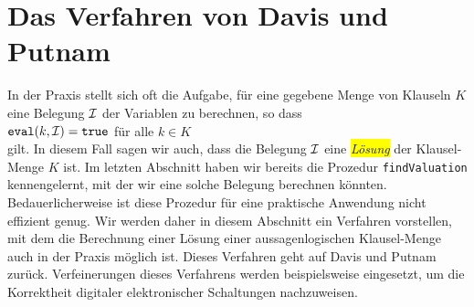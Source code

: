 \section{Das Verfahren von Davis und Putnam}
In der Praxis stellt sich oft die Aufgabe, f\"{u}r eine gegebene Menge von Klauseln $K$ eine
Belegung $\mathcal{I}$ der Variablen zu berechnen, so dass 
\\[0.2cm]
\hspace*{1.3cm} $\mathtt{eval}(k,\mathcal{I}) = \mathtt{true}$ \quad f\"{u}r alle $k\in K$ \\[0.2cm]
gilt.  In diesem Fall sagen wir auch, dass die Belegung $\mathcal{I}$ eine \colorbox{yellow}{\emph{L\"{o}sung}} der
 Klausel-Menge $K$ ist.  Im letzten Abschnitt haben wir bereits die Prozedur \texttt{findValuation}
 kennengelernt, mit der wir eine solche Belegung berechnen k\"{o}nnten.
Bedauerlicherweise ist diese Prozedur f\"{u}r eine praktische Anwendung nicht effizient genug.
Wir werden daher in diesem Abschnitt ein Verfahren vorstellen, mit dem die Berechnung einer L\"{o}sung
einer aussagenlogischen Klausel-Menge auch in der Praxis m\"{o}glich ist.
Dieses Verfahren geht auf Davis und Putnam
\cite{davis62} zur\"{u}ck.  Verfeinerungen dieses Verfahrens werden beispielsweise
eingesetzt, um die Korrektheit digitaler elektronischer Schaltungen nachzuweisen.  

